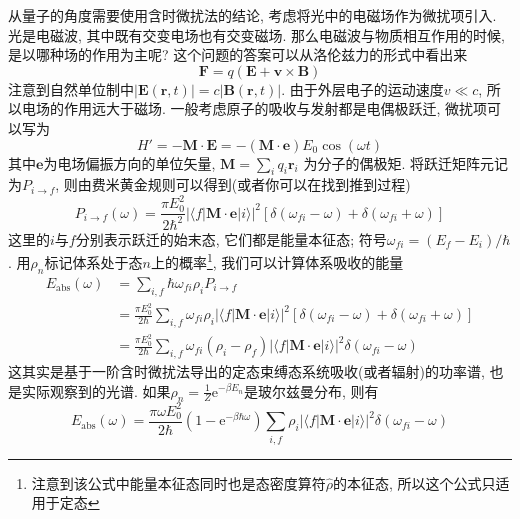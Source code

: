     从量子的角度需要使用含时微扰法的结论, 考虑将光中的电磁场作为微扰项引入. 光是电磁波, 其中既有交变电场也有交变磁场. 那么电磁波与物质相互作用的时候, 是以哪种场的作用为主呢? 这个问题的答案可以从洛伦兹力的形式中看出来
    \begin{equation}
        \bm{F} = q (\bm{E} + \bm{v} \times \bm{B})
    \end{equation}
    注意到自然单位制中$|\bm{E}(\bm r,t)| = c|\bm{B}(\bm r,t)|$. 由于外层电子的运动速度$v \ll c$, 所以电场的作用远大于磁场. 一般考虑原子的吸收与发射都是电偶极跃迁, 微扰项可以写为
    \begin{equation}
        H' = - \bm{M} \cdot \bm{E} = - (\bm{M} \cdot \bm{e}) E_0 \cos(\omega t)
    \end{equation}
    其中$\bm{e}$为电场偏振方向的单位矢量, $\bm{M} = \sum_i q_i \bm{r}_i$ 为分子的偶极矩. 将跃迁矩阵元记为$P_{i\to f}$, 则由费米黄金规则可以得到(或者你可以在\cite{蒋鸿中物化:含时微扰}找到推到过程)
    \begin{equation}
        P_{i\to f}(\omega) = \frac{\pi E_0^2}{2\hbar^2} \left| \langle f|\bm{M} \cdot \bm{e}|i \rangle \right|^2 \left[ \delta(\omega_{fi} - \omega) + \delta(\omega_{fi} + \omega) \right]
    \end{equation}
    这里的$i$与$f$分别表示跃迁的始末态, 它们都是能量本征态; 符号$\omega_{fi} = (E_f - E_i)/\hbar$. 用$\rho_n$标记体系处于态$n$上的概率\footnote{注意到该公式中能量本征态同时也是态密度算符$\hat\rho$的本征态, 所以这个公式只适用于定态}, 我们可以计算体系吸收的能量
    \begin{equation}\begin{aligned}
        E_\mathrm{abs}(\omega) 
        &= \sum_{i,f}  \hbar\omega_{fi} \rho_i P_{i\to f} \\
        &= \frac{\pi E_0^2}{2\hbar} \sum_{i,f} \omega_{fi} \rho_i \left| \langle f|\bm{M} \cdot \bm{e}|i \rangle \right|^2 \left[ \delta(\omega_{fi} - \omega) + \delta(\omega_{fi} + \omega) \right] \\
        &= \frac{\pi E_0^2}{2\hbar} \sum_{i,f} \omega_{fi} (\rho_i - \rho_f) \left| \langle f|\bm{M} \cdot \bm{e}|i \rangle \right|^2 \delta(\omega_{fi} - \omega)
    \end{aligned}\end{equation}
    这其实是基于一阶含时微扰法导出的定态束缚态系统吸收(或者辐射)的功率谱, 也是实际观察到的光谱. 如果$\rho_n = \frac 1Z \mathrm{e}^{-\beta E_n}$是玻尔兹曼分布, 则有
    \begin{equation}
        E_\mathrm{abs}(\omega) = \frac{\pi \omega E_0^2}{2\hbar} (1 - \mathrm{e}^{-\beta\hbar\omega}) \sum_{i,f} \rho_i \left| \langle f|\bm{M} \cdot \bm{e}|i \rangle \right|^2 \delta(\omega_{fi} - \omega)
    \end{equation}

